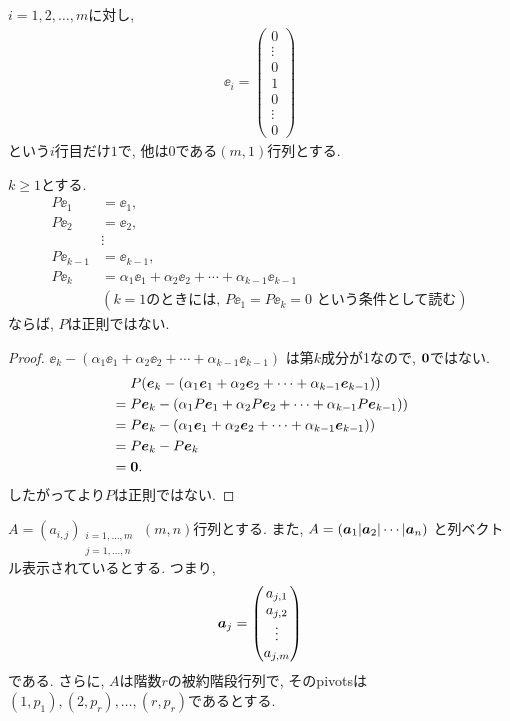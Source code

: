 $i=1,2,\ldots,m$に対し,
  \begin{align*}
    \ee_i=\begin{pmatrix}0\\\vdots\\0\\1\\0\\\vdots\\0\end{pmatrix}
  \end{align*}
という$i$行目だけ$1$で, 他は$0$である$(m,1)$行列とする.
\begin{lemma}
  \label{lem:2}
  $k\geq 1$とする.
  \begin{align*}
    P\ee_1&=\ee_1,\\
    P\ee_2&=\ee_2,\\
    &\vdots\\
    P\ee_{k-1}&=\ee_{k-1},\\
    P\ee_k&=\alpha_1\ee_1+\alpha_2\ee_2+\cdots+\alpha_{k-1}\ee_{k-1}\\
    &(\text{$k=1$のときには, $P\ee_1=P\ee_k=0$ という条件として読む})    
  \end{align*}
  ならば, $P$は正則ではない.
\end{lemma}
\begin{proof}
$\ee_k-(\alpha_1\ee_1+\alpha_2\ee_2+\cdots+\alpha_{k-1}\ee_{k-1})$
  は第$k$成分が1なので, $\boldsymbol{0}$ではない.
  \begin{align*}
    &\phantom{{}={}}P(\ee_k-(\alpha_1\ee_1+\alpha_2\ee_2+\cdots+\alpha_{k-1}\ee_{k-1}))\\
    &=
    P\ee_k-(\alpha_1P\ee_1+\alpha_2P\ee_2+\cdots+\alpha_{k-1}P\ee_{k-1}))\\
    &=
    P\ee_k-(\alpha_1\ee_1+\alpha_2\ee_2+\cdots+\alpha_{k-1}\ee_{k-1}))\\
    &=
    P\ee_k-P\ee_k\\
    &=\zzero.
  \end{align*}
  したがってより$P$は正則ではない.
\end{proof}


$A=(a_{i,j})_{\substack{i=1,\ldots,m\\j=1,\ldots,n}}$
$(m,n)$行列とする.
また,
$A=(\boldsymbol{a}_1|\boldsymbol{a}_2|\cdots|\boldsymbol{a}_n)$
と列ベクトル表示されているとする.
つまり,
\begin{align*}
  \boldsymbol{a}_j=\begin{pmatrix}a_{j,1}\\a_{j,2}\\\vdots\\a_{j,m}\end{pmatrix}
\end{align*}
である. さらに, $A$は階数$r$の被約階段行列で,
そのpivotsは$(1,p_1),(2,p_r),\ldots,(r,p_r)$であるとする.

